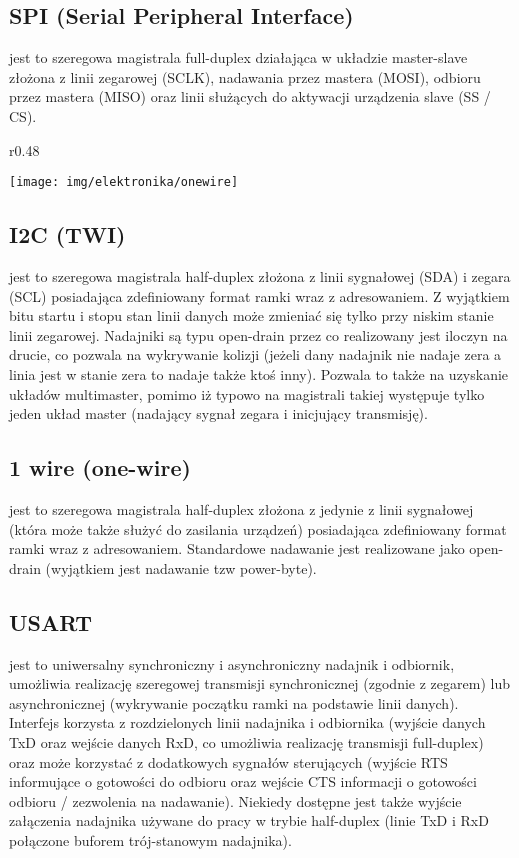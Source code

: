 \subsection{SPI (Serial Peripheral Interface)}
    jest to szeregowa magistrala full-duplex działająca w układzie master-slave złożona z linii zegarowej (SCLK), nadawania przez mastera (MOSI), odbioru przez mastera (MISO) oraz linii służących do aktywacji urządzenia slave (SS / CS). 

\begin{wrapfigure}{r}{0.48\textwidth} \begin{center} \vspace{-20pt} \texttt{[image: img/elektronika/onewire]} \vspace{-20pt} \end{center} \end{wrapfigure}

\subsection{I2C (TWI)}
    jest to szeregowa magistrala half-duplex złożona z linii sygnałowej (SDA) i zegara (SCL) posiadająca zdefiniowany format ramki wraz z adresowaniem. Z wyjątkiem bitu startu i stopu stan linii danych może zmieniać się tylko przy niskim stanie linii zegarowej.
    Nadajniki są typu open-drain przez co realizowany jest iloczyn na drucie, co pozwala na wykrywanie kolizji (jeżeli dany nadajnik nie nadaje zera a linia jest w stanie zera to nadaje także ktoś inny). Pozwala to także na uzyskanie układów multimaster, pomimo iż typowo na magistrali takiej występuje tylko jeden układ master (nadający sygnał zegara i inicjujący transmisję). 

\subsection{1 wire (one-wire)}
    jest to szeregowa magistrala half-duplex złożona z jedynie z linii sygnałowej (która może także służyć do zasilania urządzeń) posiadająca zdefiniowany format ramki wraz z adresowaniem. Standardowe nadawanie jest realizowane jako open-drain (wyjątkiem jest nadawanie tzw power-byte). 

\subsection{USART}
    jest to uniwersalny synchroniczny i asynchroniczny nadajnik i odbiornik, umożliwia realizację szeregowej transmisji synchronicznej (zgodnie z zegarem) lub asynchronicznej (wykrywanie początku ramki na podstawie linii danych). Interfejs korzysta z rozdzielonych linii nadajnika i odbiornika (wyjście danych TxD oraz wejście danych RxD, co umożliwia realizację transmisji full-duplex) oraz może korzystać z dodatkowych sygnałów sterujących (wyjście RTS informujące o gotowości do odbioru oraz wejście CTS informacji o gotowości odbioru / zezwolenia na nadawanie). Niekiedy dostępne jest także wyjście załączenia nadajnika używane do pracy w trybie half-duplex (linie TxD i RxD połączone buforem trój-stanowym nadajnika).


